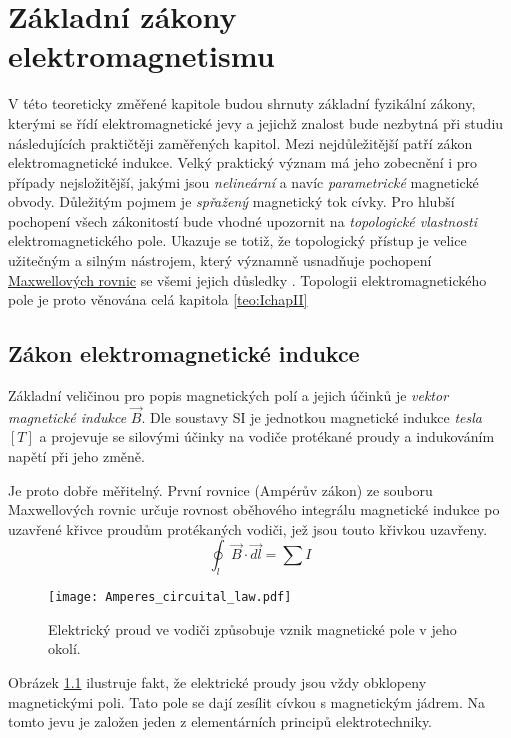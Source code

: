\chapter{Základní zákony elektromagnetismu}\label{ES:kap_zaklzelmg}
\minitoc

  V této teoreticky změřené kapitole budou shrnuty základní fyzikální zákony, kterými se řídí
  elektromagnetické jevy a jejichž znalost bude nezbytná při studiu následujících praktičtěji
  zaměřených kapitol. Mezi nejdůležitější patří zákon elektromagnetické indukce. Velký praktický
  význam má jeho zobecnění i pro případy nejsložitější, jakými jsou \emph{nelineární} a navíc
  \emph{parametrické} magnetické obvody. Důležitým pojmem je \emph{spřažený} magnetický tok cívky.
  Pro hlubší pochopení všech zákonitostí bude vhodné upozornit na \emph{topologické vlastnosti}
  elektromagnetického pole. Ukazuje se totiž, že topologický přístup je velice užitečným a silným
  nástrojem, který významně usnadňuje pochopení
  \href{http://en.wikipedia.org/wiki/Maxwell_theory}{Maxwellových rovnic} se všemi jejich důsledky
  \cite[s.~6]{Patocka4}. Topologii elektromagnetického pole je proto věnována celá kapitola
  \ref{teo:IchapII}
  
  \section{Zákon elektromagnetické indukce}\label{ES:sec01}
    Základní veličinou pro popis magnetických polí a jejich účinků je \emph{vektor magnetické
    indukce} \(\vec{B}\). Dle soustavy SI je jednotkou magnetické indukce \emph{tesla} \([T]\) a
    projevuje se silovými účinky na vodiče protékané proudy a indukováním napětí při jeho změně.

    Je proto dobře měřitelný. První rovnice (Ampérův zákon) ze souboru Maxwellových rovnic určuje
    rovnost oběhového integrálu magnetické indukce po uzavřené křivce proudům protékaných vodiči,
    jež jsou touto křivkou uzavřeny.
    \begin{equation}\label{es:eq_amp_law}
      \oint_l \vec{B} \cdot \vec{dl} = \sum I
    \end{equation}
    \begin{figure}[ht!]  %
      \centering
      \texttt{[image: Amperes\_circuital\_law.pdf]}
      \caption{Elektrický proud ve vodiči způsobuje vznik magnetické pole v jeho okolí.}
      \label{ES:fig_amp_law}
    \end{figure}
    Obrázek \ref{ES:fig_amp_law} ilustruje fakt, že elektrické proudy jsou vždy obklopeny 
    magnetickými poli. Tato pole se dají zesílit cívkou s magnetickým jádrem. Na tomto jevu je 
    založen jeden z elementárních principů elektrotechniky.    
       
